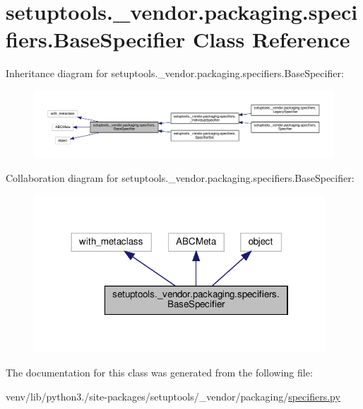 \hypertarget{classsetuptools_1_1__vendor_1_1packaging_1_1specifiers_1_1BaseSpecifier}{}\section{setuptools.\+\_\+vendor.\+packaging.\+specifiers.\+Base\+Specifier Class Reference}
\label{classsetuptools_1_1__vendor_1_1packaging_1_1specifiers_1_1BaseSpecifier}


Inheritance diagram for setuptools.\+\_\+vendor.\+packaging.\+specifiers.\+Base\+Specifier\+:
\nopagebreak
\begin{figure}[H]
\begin{center}
\leavevmode
\includegraphics[width=350pt]{classsetuptools_1_1__vendor_1_1packaging_1_1specifiers_1_1BaseSpecifier__inherit__graph}
\end{center}
\end{figure}


Collaboration diagram for setuptools.\+\_\+vendor.\+packaging.\+specifiers.\+Base\+Specifier\+:
\nopagebreak
\begin{figure}[H]
\begin{center}
\leavevmode
\includegraphics[width=310pt]{classsetuptools_1_1__vendor_1_1packaging_1_1specifiers_1_1BaseSpecifier__coll__graph}
\end{center}
\end{figure}


The documentation for this class was generated from the following file\+:\begin{DoxyCompactItemize}
\item 
venv/lib/python3./site-\/packages/setuptools/\+\_\+vendor/packaging/\hyperlink{setuptools_2__vendor_2packaging_2specifiers_8py}{specifiers.\+py}\end{DoxyCompactItemize}
